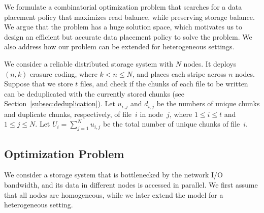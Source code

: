 
We formulate a combinatorial optimization problem that searches for a data
placement policy that maximizes read balance, while preserving storage
balance.  We argue that the problem has a huge solution space, which motivates
us to design an efficient but accurate data placement policy to solve the
problem.  We also address how our problem can be extended for heterogeneous
settings. 

We consider a reliable distributed storage system with $N$ nodes.  It deploys
$(n,k)$ erasure coding, where $k < n \le N$, and places each stripe across $n$
nodes.  Suppose that we store $t$ files, and check if the chunks of each file
to be written can be deduplicated with the currently stored chunks (see
Section~\ref{subsec:deduplication}). Let $u_{i,j}$ and $d_{i,j}$ be the
numbers of unique chunks and duplicate chunks, respectively, of file~$i$
in node~$j$, where $1\le i\le t$ and $1\le j\le N$. Let $U_i =
\sum_{j=1}^{N} u_{i,j}$ be the total number of unique chunks of file~$i$.


\subsection{Optimization Problem}
\label{subsec:p_form}

We consider a storage system that is bottlenecked by the network I/O
bandwidth, and its data in different nodes is accessed in parallel.  We first
assume that all nodes are homogeneous, while we later extend the model for a
heterogeneous setting. 

